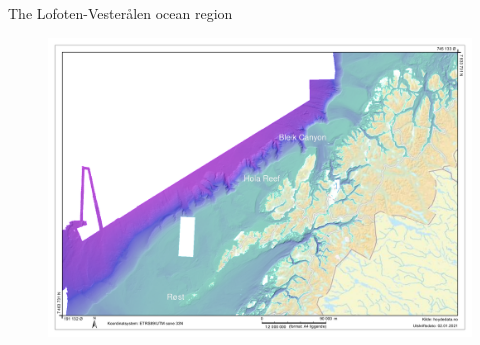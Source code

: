 \documentclass{beamer}
\begin{document}
\begin{frame}{The Lofoten-Vesterålen ocean region}
\begin{figure}
    \centering
    \includegraphics[width=\linewidth]{figures/dybdedata_stor_stedsnavn.pdf}
\end{figure}
\end{frame}
\end{document}
